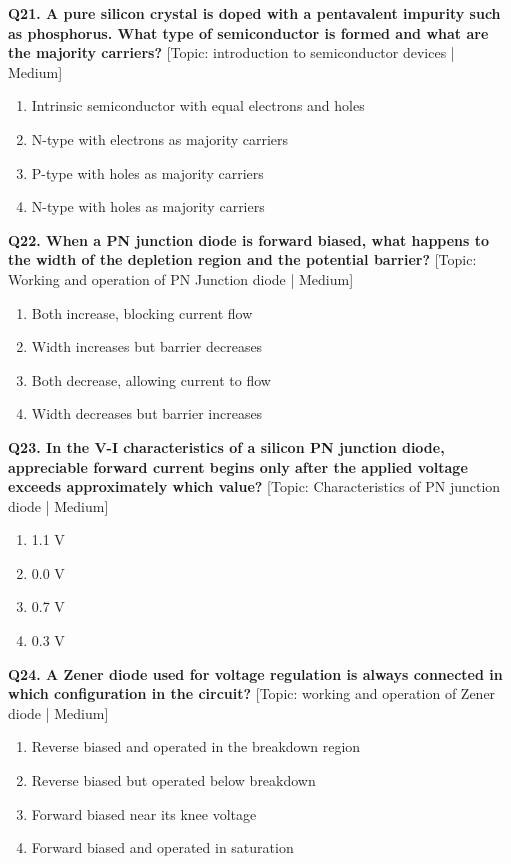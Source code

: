 \noindent\textbf{Q21. A pure silicon crystal is doped with a pentavalent impurity such as phosphorus. What type of semiconductor is formed and what are the majority carriers?} \hfill [Topic: introduction to semiconductor devices | Medium]
\begin{enumerate}[label=(\alph*),topsep=2pt,itemsep=1pt,partopsep=0pt,parsep=0pt]
    \item {Intrinsic semiconductor with equal electrons and holes}
    \item {N-type with electrons as majority carriers}
    \item {P-type with holes as majority carriers}
    \item {N-type with holes as majority carriers}
\end{enumerate}
\vspace{2mm}

\noindent\textbf{Q22. When a PN junction diode is forward biased, what happens to the width of the depletion region and the potential barrier?} \hfill [Topic: Working and operation of PN Junction diode | Medium]
\begin{enumerate}[label=(\alph*),topsep=2pt,itemsep=1pt,partopsep=0pt,parsep=0pt]
    \item {Both increase, blocking current flow}
    \item {Width increases but barrier decreases}
    \item {Both decrease, allowing current to flow}
    \item {Width decreases but barrier increases}
\end{enumerate}
\vspace{2mm}

\noindent\textbf{Q23. In the V-I characteristics of a silicon PN junction diode, appreciable forward current begins only after the applied voltage exceeds approximately which value?} \hfill [Topic: Characteristics of PN junction diode | Medium]
\begin{enumerate}[label=(\alph*),topsep=2pt,itemsep=1pt,partopsep=0pt,parsep=0pt]
    \item {1.1 V}
    \item {0.0 V}
    \item {0.7 V}
    \item {0.3 V}
\end{enumerate}
\vspace{2mm}

\noindent\textbf{Q24. A Zener diode used for voltage regulation is always connected in which configuration in the circuit?} \hfill [Topic: working and operation of Zener diode | Medium]
\begin{enumerate}[label=(\alph*),topsep=2pt,itemsep=1pt,partopsep=0pt,parsep=0pt]
    \item {Reverse biased and operated in the breakdown region}
    \item {Reverse biased but operated below breakdown}
    \item {Forward biased near its knee voltage}
    \item {Forward biased and operated in saturation}
\end{enumerate}
\vspace{2mm}

